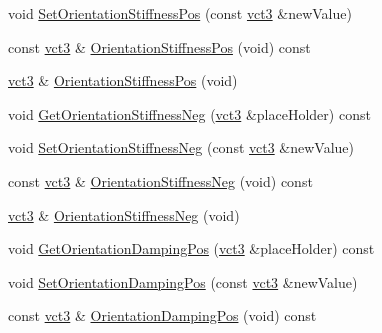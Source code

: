 \begin{DoxyCompactItemize}
void \hyperlink{classprm_fixture_gain_cartesian_set_a630b1d33fbe455656f085ad37d19f78b}{Set\+Orientation\+Stiffness\+Pos} (const \hyperlink{vct_fixed_size_vector_types_8h_a3af82acdbf4eeb73c551909240b106ea}{vct3} \&new\+Value)
\item 
const \hyperlink{vct_fixed_size_vector_types_8h_a3af82acdbf4eeb73c551909240b106ea}{vct3} \& \hyperlink{classprm_fixture_gain_cartesian_set_ad959355b4b9855f48febb049aca90443}{Orientation\+Stiffness\+Pos} (void) const 
\item 
\hyperlink{vct_fixed_size_vector_types_8h_a3af82acdbf4eeb73c551909240b106ea}{vct3} \& \hyperlink{classprm_fixture_gain_cartesian_set_ac5e6f2f8a689f091845fd1cfec263212}{Orientation\+Stiffness\+Pos} (void)
\item 
void \hyperlink{classprm_fixture_gain_cartesian_set_a3da217f1bd0996ab40b57cce396c6287}{Get\+Orientation\+Stiffness\+Neg} (\hyperlink{vct_fixed_size_vector_types_8h_a3af82acdbf4eeb73c551909240b106ea}{vct3} \&place\+Holder) const 
\item 
void \hyperlink{classprm_fixture_gain_cartesian_set_a730ab2096d29549d416ff35cd2e0e5e9}{Set\+Orientation\+Stiffness\+Neg} (const \hyperlink{vct_fixed_size_vector_types_8h_a3af82acdbf4eeb73c551909240b106ea}{vct3} \&new\+Value)
\item 
const \hyperlink{vct_fixed_size_vector_types_8h_a3af82acdbf4eeb73c551909240b106ea}{vct3} \& \hyperlink{classprm_fixture_gain_cartesian_set_ad64ec1fee6a61c839ba9468633eb1073}{Orientation\+Stiffness\+Neg} (void) const 
\item 
\hyperlink{vct_fixed_size_vector_types_8h_a3af82acdbf4eeb73c551909240b106ea}{vct3} \& \hyperlink{classprm_fixture_gain_cartesian_set_af7c2970eae2fd5c2162af6857e083f6d}{Orientation\+Stiffness\+Neg} (void)
\item 
void \hyperlink{classprm_fixture_gain_cartesian_set_ab2dd20be6f7c035f5f1cab7deb7e0e7d}{Get\+Orientation\+Damping\+Pos} (\hyperlink{vct_fixed_size_vector_types_8h_a3af82acdbf4eeb73c551909240b106ea}{vct3} \&place\+Holder) const 
\item 
void \hyperlink{classprm_fixture_gain_cartesian_set_aeab6a8418870cf538370c43e33eb9511}{Set\+Orientation\+Damping\+Pos} (const \hyperlink{vct_fixed_size_vector_types_8h_a3af82acdbf4eeb73c551909240b106ea}{vct3} \&new\+Value)
\item 
const \hyperlink{vct_fixed_size_vector_types_8h_a3af82acdbf4eeb73c551909240b106ea}{vct3} \& \hyperlink{classprm_fixture_gain_cartesian_set_a5f862c63126323d166cab7b97969e274}{Orientation\+Damping\+Pos} (void) const 

\end{DoxyCompactItemize}
